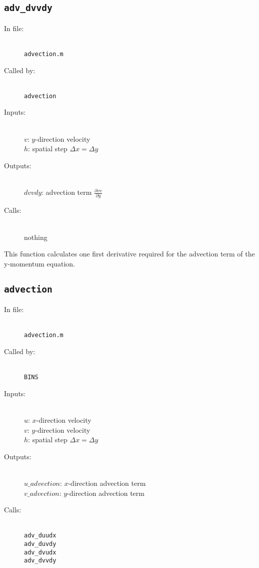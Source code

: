 \documentclass[12pt]{article}
\begin{document}
\subsection{\texttt{adv\_dvvdy}}
\begin{description}
\item[In file:] \hfill \\ \texttt{advection.m}
\item[Called by:] \hfill \\ \texttt{advection}
\item[Inputs:] \hfill \\ $v$: $y$-direction velocity \\ $h$: spatial step $\Delta x = \Delta y$
\item[Outputs:] \hfill \\ $dvvdy$: advection term $\frac{\partial vv}{\partial y}$
\item[Calls:] \hfill \\ nothing
\end{description}
This function calculates one first derivative required for the advection term of the y-momentum equation.

\subsection{\texttt{advection}}
\begin{description}
\item[In file:] \hfill \\ \texttt{advection.m}
\item[Called by:] \hfill \\ \texttt{BINS}
\item[Inputs:] \hfill \\ $u$: $x$-direction velocity \\ $v$: $y$-direction velocity \\ $h$: spatial step $\Delta x = \Delta y$ 
\item[Outputs:] \hfill \\ $u\_advection$: $x$-direction advection term \\ $v\_advection$: $y$-direction advection term 
\item[Calls:] \hfill \\ \texttt{adv\_duudx} \\ \texttt{adv\_duvdy} \\ \texttt{adv\_dvudx} \\ \texttt{adv\_dvvdy}
\end{description}
\end{document}
